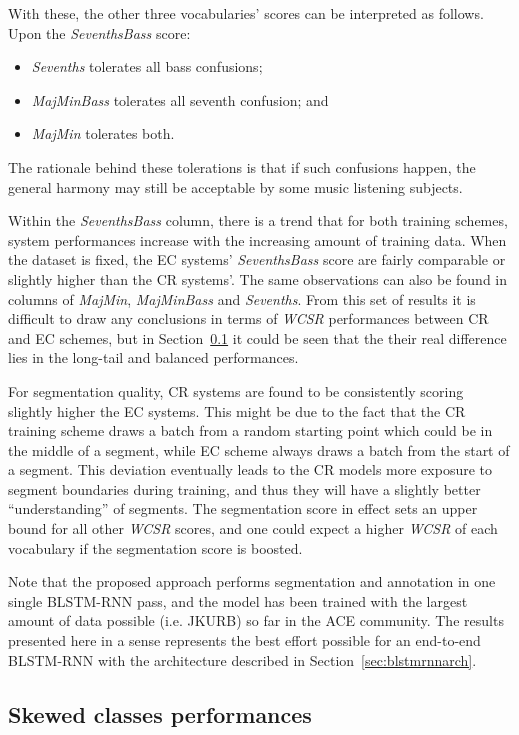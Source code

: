 With these, the other three vocabularies' scores can be interpreted as follows. Upon the \textit{SeventhsBass} score:
\begin{itemize}
	\item \textit{Sevenths} tolerates all bass confusions;
	\item \textit{MajMinBass} tolerates all seventh confusion; and
	\item \textit{MajMin} tolerates both.
\end{itemize}
The rationale behind these tolerations is that if such confusions happen, the general harmony may still be acceptable by some music listening subjects.

Within the \textit{SeventhsBass} column, there is a trend that for both training schemes, system performances increase with the increasing amount of training data. When the dataset is fixed, the EC systems' \textit{SeventhsBass} score are fairly comparable or slightly higher than the CR systems'. The same observations can also be found in columns of \textit{MajMin}, \textit{MajMinBass} and \textit{Sevenths}. From this set of results it is difficult to draw any conclusions in terms of \textit{WCSR} performances between CR and EC schemes, but in Section~\ref{sec:4-scper} it could be seen that the their real difference lies in the long-tail and balanced performances.

For segmentation quality, CR systems are found to be consistently scoring slightly higher the EC systems. This might be due to the fact that the CR training scheme draws a batch from a random starting point which could be in the middle of a segment, while EC scheme always draws a batch from the start of a segment. This deviation eventually leads to the CR models more exposure to segment boundaries during training, and thus they will have a slightly better ``understanding'' of segments. The segmentation score in effect sets an upper bound for all other \textit{WCSR} scores, and one could expect a higher \textit{WCSR} of each vocabulary if the segmentation score is boosted.

Note that the proposed approach performs segmentation and annotation in one single BLSTM-RNN pass, and the model has been trained with the largest amount of data possible (i.e. JKURB) so far in the ACE community. The results presented here in a sense represents the best effort possible for an end-to-end BLSTM-RNN with the architecture described in Section~\ref{sec:blstmrnnarch}.

\subsection{Skewed classes performances} \label{sec:4-scper}

